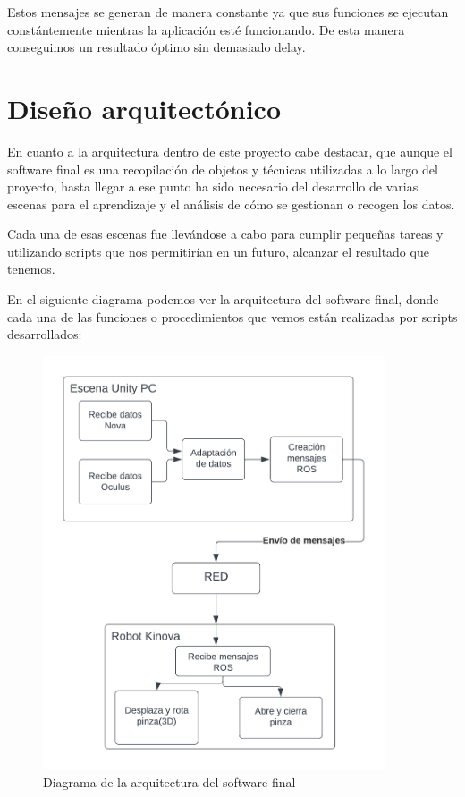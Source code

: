         Estos mensajes se generan de manera constante ya que sus funciones se ejecutan constántemente mientras la aplicación esté funcionando. De esta manera conseguimos un resultado óptimo sin demasiado delay.

\section{Diseño arquitectónico}
En cuanto a la arquitectura dentro de este proyecto cabe destacar, que aunque el software final es una recopilación de objetos y técnicas utilizadas a lo largo del proyecto, hasta llegar a ese punto ha sido necesario del desarrollo de varias escenas para el aprendizaje y el análisis de cómo se gestionan o recogen los datos.

Cada una de esas escenas fue llevándose a cabo para cumplir pequeñas tareas y utilizando scripts que nos permitirían en un futuro, alcanzar el resultado que tenemos.

En el siguiente diagrama podemos ver la arquitectura del software final, donde cada una de las funciones o procedimientos que vemos están realizadas por scripts desarrollados:

\begin{figure}[h]
\centering
\label{Diagrama de la arquitectura del software final}
\includegraphics[width=0.9\textwidth]{img/diagrama arquitectura.png}
\caption{Diagrama de la arquitectura del software final}
\end{figure}


